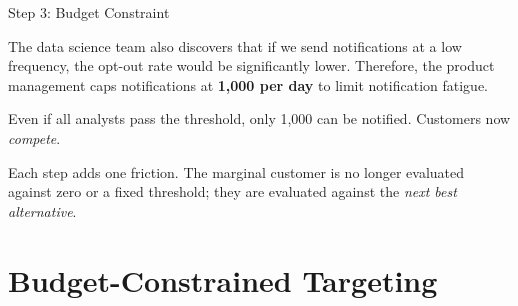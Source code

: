 \documentclass[aspectratio=169, 11pt, handout]{beamer}
\begin{document}
\begin{frame}{Step 3: Budget Constraint}

The data science team also discovers that if we send notifications at a low frequency, the opt-out rate would be significantly lower. Therefore, the product management caps notifications at \textbf{1,000 per day} to limit notification fatigue.

\bigskip

Even if all analysts pass the threshold, only 1,000 can be notified. Customers now \emph{compete}.

\pause
\bigskip

\begin{center}
\end{center}

\bigskip

Each step adds one friction. The marginal customer is no longer evaluated against zero or a fixed threshold; they are evaluated against the \emph{next best alternative}.

\end{frame}


\section{Budget-Constrained Targeting}
\end{document}
